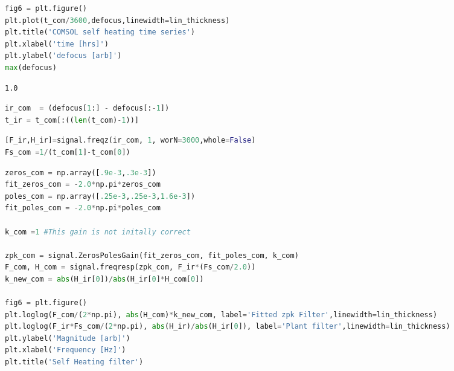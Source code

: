 \begin{spacing}{1} \begin{lstlisting}[language=Python]
fig6 = plt.figure()
plt.plot(t_com/3600,defocus,linewidth=lin_thickness)
plt.title('COMSOL self heating time series')
plt.xlabel('time [hrs]')
plt.ylabel('defocus [arb]')
max(defocus)
\end{lstlisting} \end{spacing}

\begin{spacing}{1} \begin{lstlisting}
1.0
\end{lstlisting} \end{spacing}


\begin{spacing}{1} \begin{lstlisting}[language=Python]
ir_com  = (defocus[1:] - defocus[:-1])
t_ir = t_com[:((len(t_com)-1))]
\end{lstlisting} \end{spacing}

\begin{spacing}{1} \begin{lstlisting}[language=Python]
[F_ir,H_ir]=signal.freqz(ir_com, 1, worN=3000,whole=False) 
Fs_com =1/(t_com[1]-t_com[0])
\end{lstlisting} \end{spacing}

\begin{spacing}{1} \begin{lstlisting}[language=Python]
zeros_com = np.array([.9e-3,.3e-3])
fit_zeros_com = -2.0*np.pi*zeros_com
poles_com = np.array([.25e-3,.25e-3,1.6e-3])
fit_poles_com = -2.0*np.pi*poles_com

k_com =1 #This gain is not initally correct

zpk_com = signal.ZerosPolesGain(fit_zeros_com, fit_poles_com, k_com)
F_com, H_com = signal.freqresp(zpk_com, F_ir*(Fs_com/2.0))
k_new_com = abs(H_ir[0])/abs(H_ir[0]*H_com[0])

fig6 = plt.figure()
plt.loglog(F_com/(2*np.pi), abs(H_com)*k_new_com, label='Fitted zpk Filter',linewidth=lin_thickness)
plt.loglog(F_ir*Fs_com/(2*np.pi), abs(H_ir)/abs(H_ir[0]), label='Plant filter',linewidth=lin_thickness)
plt.ylabel('Magnitude [arb]')
plt.xlabel('Frequency [Hz]')
plt.title('Self Heating filter')
\end{lstlisting} \end{spacing}

